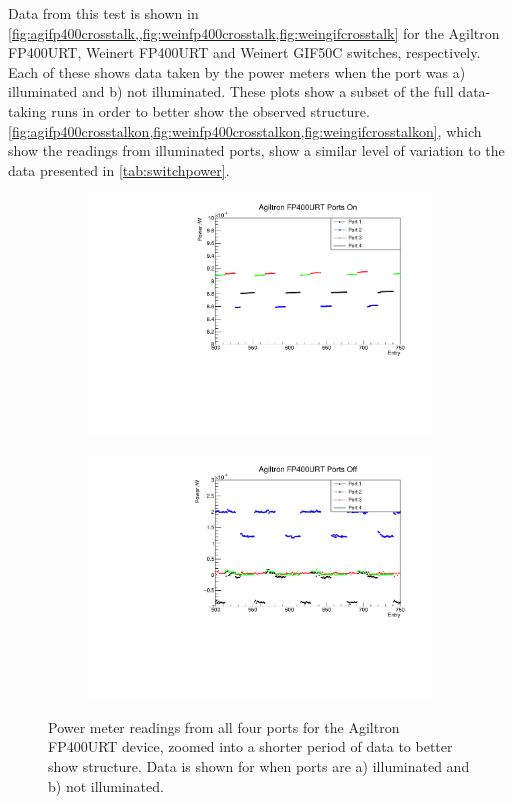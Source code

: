 \documentclass[a4paper,11pt]{article}
\begin{document}
Data from this test is shown in \cref{fig:agifp400crosstalk,,fig:weinfp400crosstalk,fig:weingifcrosstalk} for the Agiltron FP400URT, Weinert FP400URT and Weinert GIF50C switches, respectively. Each of these shows data taken by the power meters when the port was a) illuminated and b) not illuminated. These plots show a subset of the full data-taking runs in order to better show the observed structure. \cref{fig:agifp400crosstalkon,fig:weinfp400crosstalkon,fig:weingifcrosstalkon}, which show the readings from illuminated ports, show a similar level of variation to the data presented in \cref{tab:switchpower}.
\begin{figure}[h!]
\centering
\begin{subfigure}{0.5\textwidth}
\includegraphics[width=\linewidth]{AgiltronFP400URTPortsOnZoom.pdf}
\subcaption{}\label{fig:agifp400crosstalkon}
\end{subfigure}%
\begin{subfigure}{0.5\textwidth}
\includegraphics[width=\linewidth]{AgiltronFP400URTPortsOffZoom.pdf}
\subcaption{}\label{fig:agifp400crosstalkoff}
\end{subfigure}
\caption{Power meter readings from all four ports for the Agiltron FP400URT device, zoomed into a shorter period of data to better show structure. Data is shown for when ports are a) illuminated and b) not illuminated.}\label{fig:agifp400crosstalk}
\end{figure}
\end{document}

